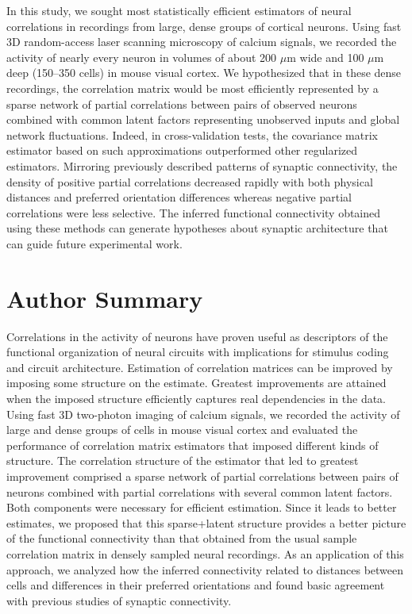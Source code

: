 \documentclass[10pt]{article}
\begin{document}
In this study, we sought most statistically efficient estimators of neural correlations in recordings from large, dense groups of cortical neurons.  Using fast 3D random-access laser scanning microscopy of calcium signals, we recorded the activity of nearly every neuron in volumes of about 200 $\mu$m wide and 100 $\mu$m deep (150--350 cells) in mouse visual cortex.  We hypothesized that in these dense recordings, the correlation matrix would be most efficiently represented by a sparse network of partial correlations between pairs of observed neurons combined with common latent factors representing unobserved inputs and global network fluctuations.  Indeed, in cross-validation tests, the covariance matrix estimator based on such approximations outperformed other regularized estimators. Mirroring previously described patterns of synaptic connectivity, the density of positive partial correlations decreased rapidly with both physical distances and preferred orientation differences whereas negative partial correlations were less selective.  The inferred functional connectivity obtained using these methods can generate hypotheses about synaptic architecture that can guide future experimental work.
\section*{Author Summary}
Correlations in the activity of neurons have proven useful as descriptors of the functional organization of neural circuits with implications for stimulus coding and circuit architecture.  Estimation of correlation matrices can be improved by imposing some structure on the estimate. Greatest improvements are attained when the imposed structure efficiently captures real dependencies in the data. Using fast 3D two-photon imaging of calcium signals, we recorded the activity of large and dense groups of cells in mouse visual cortex and evaluated the performance of correlation matrix estimators that imposed different kinds of structure. The correlation structure of the estimator that led to greatest improvement comprised a sparse network of partial correlations between pairs of neurons combined with partial correlations with several common latent factors. Both components were necessary for efficient estimation. Since it leads to better estimates, we proposed that this sparse+latent structure provides a better picture of the functional connectivity than that obtained from the usual sample correlation matrix in densely sampled neural recordings. As an application of this approach, we analyzed how the inferred connectivity related to distances between cells and differences in their preferred orientations and found basic agreement with previous studies of synaptic connectivity.
\end{document}

